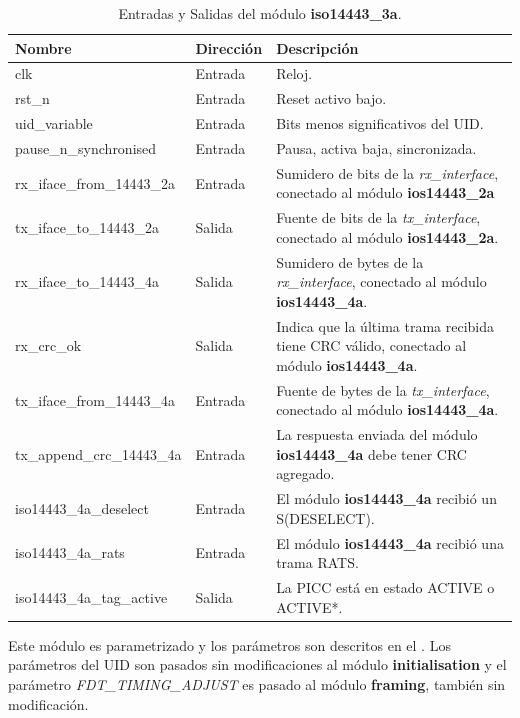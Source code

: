 \documentclass[a4paper, twoside, 11pt]{report}
\begin{document}
\begin{table}[htb]
  \centering
  \tablezebra
  \begin{tabulary}{\linewidth}{l|l|L}
    \setcounter{rownum}{0}
    \textbf{Nombre}&\textbf{Dirección}&\textbf{Descripción} \\
    \hline
    clk&Entrada&Reloj. \\
    rst\_n&Entrada&Reset activo bajo. \\
    uid\_variable&Entrada&Bits menos significativos del UID. \\
    pause\_n\_synchronised&Entrada&Pausa, activa baja, sincronizada. \\
    rx\_iface\_from\_14443\_2a&Entrada&Sumidero de bits de la \textit{rx\_interface}, conectado al módulo \textbf{ios14443\_2a} \\
    tx\_iface\_to\_14443\_2a&Salida&Fuente de bits de la \textit{tx\_interface}, conectado al módulo \textbf{ios14443\_2a}. \\
    rx\_iface\_to\_14443\_4a&Salida&Sumidero de bytes de la \textit{rx\_interface}, conectado al módulo \textbf{ios14443\_4a}. \\
    rx\_crc\_ok&Salida&Indica que la última trama recibida tiene CRC válido, conectado al módulo \textbf{ios14443\_4a}. \\
    tx\_iface\_from\_14443\_4a&Entrada&Fuente de bytes de la \textit{tx\_interface}, conectado al módulo \textbf{ios14443\_4a}. \\
    tx\_append\_crc\_14443\_4a&Entrada&La respuesta enviada del módulo \textbf{ios14443\_4a} debe tener CRC agregado. \\
    iso14443\_4a\_deselect&Entrada&El módulo \textbf{ios14443\_4a} recibió un S(DESELECT). \\
    iso14443\_4a\_rats&Entrada&El módulo \textbf{ios14443\_4a} recibió una trama RATS. \\
    iso14443\_4a\_tag\_active&Salida&La PICC está en estado ACTIVE o ACTIVE*. \\
  \end{tabulary}
  \caption{Entradas y Salidas del módulo \textbf{iso14443\_3a}.}
  \label{tab:ports_iso14443_3a}
\end{table}

\FloatBarrier

Este módulo es parametrizado y los parámetros son descritos en el . Los parámetros del UID son pasados sin modificaciones al módulo \textbf{initialisation} y el parámetro \textit{FDT\_TIMING\_ADJUST} es pasado al módulo \textbf{framing}, también sin modificación.
\end{document}
